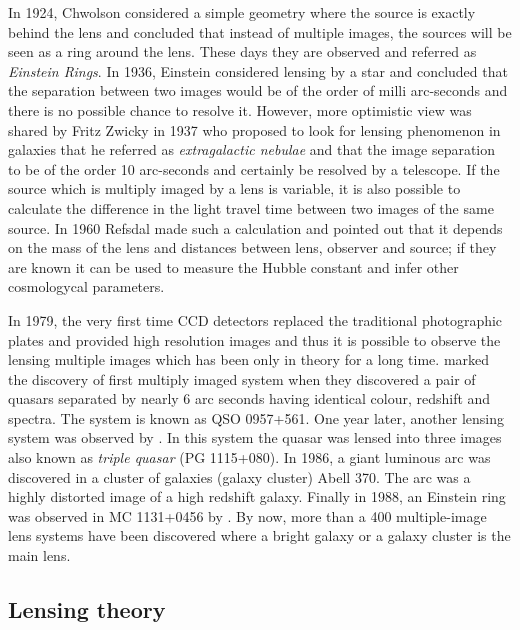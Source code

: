 In 1924, Chwolson
considered a simple geometry where the source is exactly behind the lens
and concluded that instead of multiple images, the sources will be seen
as a ring around the lens. These days they are observed and referred as {\it Einstein Rings}.
In 1936, Einstein
considered lensing by a star and concluded that the separation between two images
would be of the order of milli arc-seconds and there is no possible chance to
resolve it. However, more optimistic view was shared by Fritz Zwicky in 1937 who
proposed to look for lensing phenomenon in galaxies that he referred as 
{\it extragalactic nebulae} and that the image separation to be of the order 10 arc-seconds
and certainly be resolved by a telescope. If the source which is multiply imaged
by a lens is variable, it is also possible to calculate the difference 
in the light travel time between two images of the same source. In 1960 Refsdal
made such a calculation and pointed out that it depends on the mass of the lens
and distances between lens, observer and source; if they are known it can be 
used to measure the Hubble constant and infer other cosmologycal parameters. 



In 1979, the very first time CCD detectors replaced the traditional photographic
plates and provided high resolution 
images and thus it is possible to observe the lensing multiple images
which has been only in theory for a long time. \cite{1979Natur.279..381W} marked
the discovery of first multiply imaged system when they discovered a pair of quasars
separated by nearly 6 arc seconds having identical colour, redshift and spectra. The
system is known as QSO 0957+561. One year later, another lensing system was observed
by \cite{1980Natur.285..641W}. In this system the quasar was lensed into three
images also known as {\it triple quasar} (PG 1115+080). In 1986, a giant luminous
arc was discovered in a cluster of galaxies (galaxy cluster) Abell 370. The arc
was a highly distorted image of a high redshift galaxy. Finally in 1988, an Einstein
ring was observed in MC 1131+0456 by \cite{1988Natur.333..537H}. By now, more than 
a 400 multiple-image lens systems have been discovered where a bright galaxy
or a galaxy cluster is the main lens. 





\subsection{Lensing theory}

